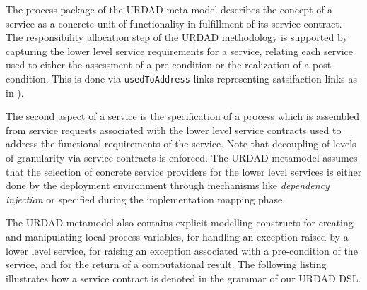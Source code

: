 The process package of the URDAD meta model describes the concept of a service as a concrete unit of functionality in fulfillment of its service contract. The responsibility allocation step of the URDAD methodology is supported by capturing the lower level service requirements for a service, relating each service used to either the assessment of a pre-condition or the realization of a post-condition. This is done via \verb+usedToAddress+ links representing satsifaction links as in  \cite{ramesh_toward_2001}). 

The second aspect of a service is the specification of a process which is assembled from service requests associated with the lower level service contracts used to address the functional requirements of the service. Note that decoupling of levels of granularity via service contracts is enforced. The URDAD metamodel assumes that the selection of concrete service providers for the lower level services is either done by the deployment environment through mechanisms like \emph{dependency injection} or specified during the implementation mapping phase.

The URDAD metamodel also contains explicit modelling constructs for creating and manipulating local process variables,  for handling an exception raised by a lower level service, for raising an exception associated with a pre-condition of the service, and for the return of a computational result. The following listing illustrates how a service contract is denoted in the grammar of our URDAD DSL.

